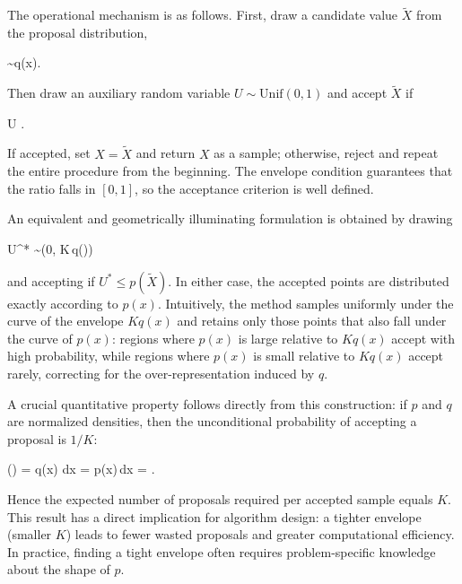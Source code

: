 The operational mechanism is as follows. First, draw a candidate value $\tilde{X}$ from the proposal distribution,
\begin{myequation}
 \sim q(x).
\end{myequation}
Then draw an auxiliary random variable $U\sim \mathrm{Unif}(0,1)$ and accept $\tilde{X}$ if
\begin{myequation}
U \le {}.
\end{myequation}
If accepted, set $X=\tilde{X}$ and return $X$ as a sample; otherwise, reject and repeat the entire procedure from the beginning. The envelope condition guarantees that the ratio falls in $[0,1]$, so the acceptance criterion is well defined.

An equivalent and geometrically illuminating formulation is obtained by drawing
\begin{myequation}
U^* \sim {}\bigl(0, K\,q()\bigr)
\end{myequation}
and accepting if $U^* \le p(\tilde{X})$. In either case, the accepted points are distributed exactly according to $p(x)$. Intuitively, the method samples uniformly under the curve of the envelope $Kq(x)$ and retains only those points that also fall under the curve of $p(x)$: regions where $p(x)$ is large relative to $Kq(x)$ accept with high probability, while regions where $p(x)$ is small relative to $Kq(x)$ accept rarely, correcting for the over-representation induced by $q$.

\medskip

A crucial quantitative property follows directly from this construction: if $p$ and $q$ are normalized densities, then the unconditional probability of accepting a proposal is $1/K$:
\begin{myequation}
()
= \int q(x)\,\,dx
= \int p(x)\,dx
= .
\end{myequation}
Hence the expected number of proposals required per accepted sample equals $K$. This result has a direct implication for algorithm design: a tighter envelope (smaller $K$) leads to fewer wasted proposals and greater computational efficiency. In practice, finding a tight envelope often requires problem-specific knowledge about the shape of $p$.

\medskip

